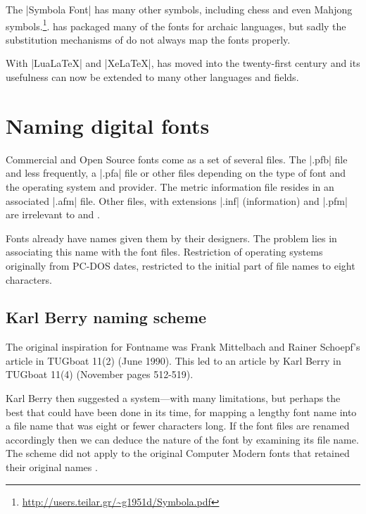 %

The |Symbola Font| has many other symbols, including chess and even Mahjong symbols.\footnote{\url{http://users.teilar.gr/~g1951d/Symbola.pdf}}.  has packaged many of the fonts for archaic languages, but sadly the substitution mechanisms of \latexe do not always map the fonts properly.

With |LuaLaTeX| and |XeLaTeX|, \tex has moved into the twenty-first century and its usefulness can now be extended to many other languages and fields. 

\section{Naming digital fonts}

Commercial and Open Source fonts come as a set of several files. The |.pfb| file and less frequently, a |.pfa| file or other files depending on the type of font and the operating system and provider. The metric information file resides in an associated |.afm| file. Other files, with extensions |.inf| (information) and |.pfm| are irrelevant to \latex and \tex.

Fonts already have names given them by their designers. The problem lies in associating this name with the font files. Restriction of operating systems originally from PC-DOS dates, restricted to the initial part of file names to eight characters.

\subsection{Karl Berry naming scheme}

The original inspiration for Fontname was Frank Mittelbach and Rainer Schoepf's article in TUGboat 11(2) (June 1990). This led to an article by Karl Berry in TUGboat 11(4) (November pages 512-519).

Karl Berry then suggested a system---with many limitations, but perhaps the best that could have been done in its time, for mapping a lengthy font name into a file name that was eight or fewer characters long. If the font files are renamed accordingly then we can deduce the nature of the font by examining its file name. The scheme did not apply to the original Computer Modern fonts that retained their original names \citep{fontname}.

